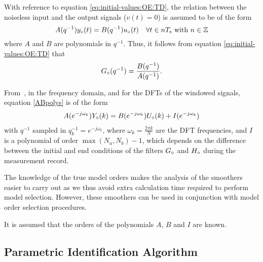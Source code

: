 With reference to equation \eqref{eq:initial-values:OE:TD}, the relation between the noiseless input and the output signals ($v(t)= 0$) is assumed to be of the form
\begin{equation}
    A(q^{-1}) {y}_{\circ}(t) = B(q^{-1}) {u}_{\circ}(t) \quad \forall t \in n T_{\mathrm{s}}{}  \text{ with }  n \in \mathbb{Z}
\label{ABpolys}
\end{equation}
where $A$ and $B$ are polynomials in $q^{-1}$. 
Thus, it follows from equation \eqref{eq:initial-values:OE:TD} that
\begin{equation}
    {G}_{\circ}(q^{-1})= \frac{B(q^{-1})}{A(q^{-1})}
    \text{.}
\end{equation}

From~\citet[Section 6.3.2.]{Pintelon2012}, in the frequency domain, and for the \glspl{DFT} of the windowed signals, equation \eqref{ABpolys} is of the form
\begin{align}
A(e^{-j\omega_k}){Y}_{\circ}(k) = B(e^{-j\omega_k}){U}_{\circ}(k) + I(e^{-j\omega_k})
\label{DFTspectra}
\end{align}
with $q^{-1}$ sampled in  $q_k^{-1} = e^{-j\omega_k}$, where $\omega_k = \frac{2\pi k}{N}$ are the \gls{DFT} frequencies, and $I$ is a polynomial of order $\max(N_a,N_b) - 1$, which depends on the difference between the initial and end conditions of the filters ${G}_{\circ}$ and ${H}_{\circ}$ during the measurement record.

\begin{remark}
The knowledge of the true model orders makes the analysis of the smoothers easier to carry out as we thus avoid extra calculation time required to perform model selection.
However, these smoothers can be used in conjunction with model order selection procedures.
\end{remark}

\begin{assumption}
It is assumed that the orders of the polynomials $A$, $B$ and $I$ are known.
\end{assumption}


\subsection{Parametric Identification Algorithm}\label{sec:initial-values:paramIdentAlgo}


